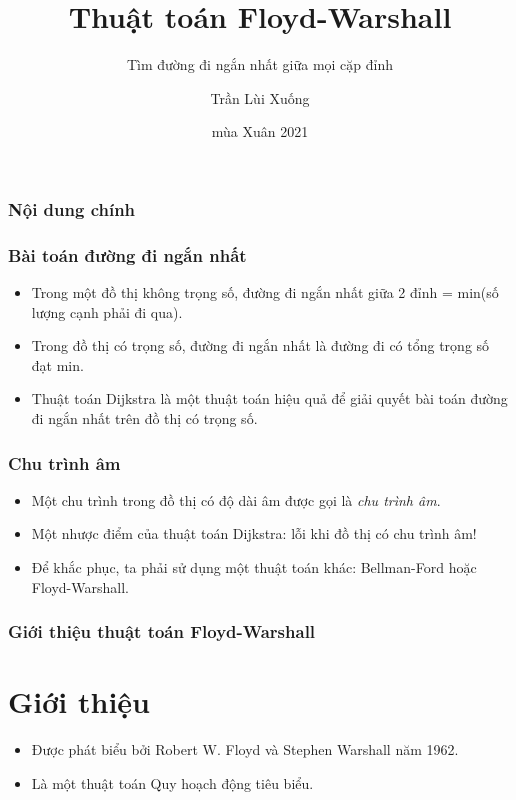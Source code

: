 \documentclass[12pt]{beamer}
\begin{document}
    \author{Trần Lùi Xuống}
    \title{Thuật toán Floyd-Warshall}
    \subtitle{Tìm đường đi ngắn nhất giữa mọi cặp đỉnh}
    \date{mùa Xuân 2021}
    \begin{frame}[plain]
        \maketitle
    \end{frame}

    \begin{frame}
    \frametitle{Nội dung chính}
    \tableofcontents
    \end{frame}

    \begin{frame}[t]
        \frametitle{Bài toán đường đi ngắn nhất}
        \begin{itemize}
            \item Trong một đồ thị không trọng số, đường đi ngắn nhất giữa 2 đỉnh = min(số lượng cạnh phải đi qua).
            \item Trong đồ thị có trọng số, đường đi ngắn nhất là đường đi có tổng trọng số đạt min.
            \item Thuật toán Dijkstra là một thuật toán hiệu quả để giải quyết bài toán đường đi ngắn nhất trên đồ thị có trọng số.
        \end{itemize}
    \end{frame}

    \begin{frame}[t]
        \frametitle{Chu trình âm}
        \begin{itemize}
            \item Một chu trình trong đồ thị có độ dài âm được gọi là \textit{chu trình âm}.
            \item Một nhược điểm của thuật toán Dijkstra: lỗi khi đồ thị có chu trình âm!
            \item Để khắc phục, ta phải sử dụng một thuật toán khác: Bellman-Ford hoặc Floyd-Warshall.
        \end{itemize}
    \end{frame}

    \begin{frame}[t]
        \frametitle{Giới thiệu thuật toán Floyd-Warshall}
        \section{Giới thiệu}

        \begin{itemize}
            \item Được phát biểu bởi Robert W. Floyd và Stephen Warshall năm 1962.
            \item Là một thuật toán Quy hoạch động tiêu biểu.
        \end{itemize}
    \end{frame}
\end{document}
